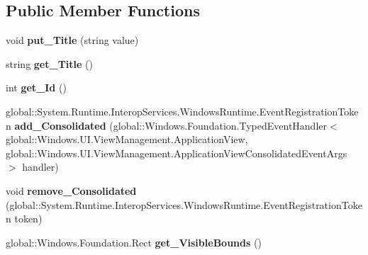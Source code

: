 \subsection*{Public Member Functions}
\begin{DoxyCompactItemize}
\item 
\mbox{\label{class_windows_1_1_u_i_1_1_view_management_1_1_application_view_ac9a73477b84f2c3e9e09660fdfe04e89}} 
void {\bfseries put\+\_\+\+Title} (string value)
\item 
\mbox{\label{class_windows_1_1_u_i_1_1_view_management_1_1_application_view_a08cf5cd5b2e28afa51bc13468334352a}} 
string {\bfseries get\+\_\+\+Title} ()
\item 
\mbox{\label{class_windows_1_1_u_i_1_1_view_management_1_1_application_view_a4327352f99894f72219cfb4cad222952}} 
int {\bfseries get\+\_\+\+Id} ()
\item 
\mbox{\label{class_windows_1_1_u_i_1_1_view_management_1_1_application_view_a0ffeec110a4a66c247c6e2a9b4be797b}} 
global\+::\+System.\+Runtime.\+Interop\+Services.\+Windows\+Runtime.\+Event\+Registration\+Token {\bfseries add\+\_\+\+Consolidated} (global\+::\+Windows.\+Foundation.\+Typed\+Event\+Handler$<$ global\+::\+Windows.\+U\+I.\+View\+Management.\+Application\+View, global\+::\+Windows.\+U\+I.\+View\+Management.\+Application\+View\+Consolidated\+Event\+Args $>$ handler)
\item 
\mbox{\label{class_windows_1_1_u_i_1_1_view_management_1_1_application_view_a1c5d2a3b58064582c6456f48994b44d6}} 
void {\bfseries remove\+\_\+\+Consolidated} (global\+::\+System.\+Runtime.\+Interop\+Services.\+Windows\+Runtime.\+Event\+Registration\+Token token)
\item 
\mbox{\label{class_windows_1_1_u_i_1_1_view_management_1_1_application_view_aee267cf0554bac921b2c6c10392310b7}} 
global\+::\+Windows.\+Foundation.\+Rect {\bfseries get\+\_\+\+Visible\+Bounds} ()

\end{DoxyCompactItemize}

